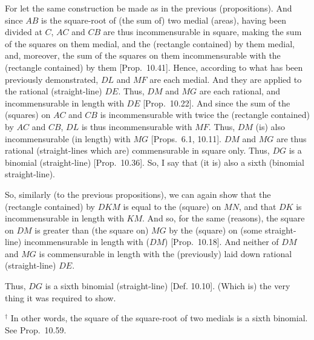 \begin{Parallel}{}{}
{\epsfysize=1.6in 
\centerline{}

For  let the same construction  be made  as in the previous (propositions). And since $AB$ is the square-root of (the sum of) two medial
(areas), having been divided at $C$, $AC$ and $CB$ are thus incommensurable
in square, making the sum of the squares on them medial, and the (rectangle
contained) by them medial, and, moreover, the sum of the squares on them
incommensurable with the (rectangle contained) by them [Prop.~10.41]. Hence, according to
what has been previously  demonstrated, $DL$ and $MF$ are each medial.
And they are applied to the rational (straight-line) $DE$. Thus, $DM$ and
$MG$ are each rational, and incommensurable in length with $DE$ [Prop.~10.22]. And since the sum of the (squares)
on $AC$ and $CB$ is incommensurable with twice the (rectangle contained)
by $AC$ and $CB$, $DL$ is thus incommensurable with $MF$. Thus,
$DM$ (is) also incommensurable (in length) with $MG$
[Props.~6.1, 10.11]. 
$DM$ and $MG$ are thus rational (straight-lines which are) commensurable
in square only. Thus, $DG$ is a binomial (straight-line) [Prop.~10.36]. So, I say that (it is) also a sixth
(binomial straight-line).

So, similarly (to the previous propositions), we can again show that the (rectangle contained) by $DKM$ is equal to the (square) on $MN$, and that
$DK$ is incommensurable in length with $KM$. And so, for the same (reasons), the square on $DM$ is greater than (the square on) $MG$ by the
(square) on (some straight-line) incommensurable in length with ($DM$) [Prop.~10.18]. And neither of $DM$ and $MG$
is commensurable in length with the (previously) laid down rational (straight-line) $DE$.

Thus, $DG$ is a sixth binomial (straight-line) [Def. 10.10]. (Which is) the very thing it
was required to show.}
\end{Parallel}
{\footnotesize\noindent $^\dag$ In other words, the square of the square-root of  two  medials  is a
sixth binomial. See Prop.~10.59.\\}

